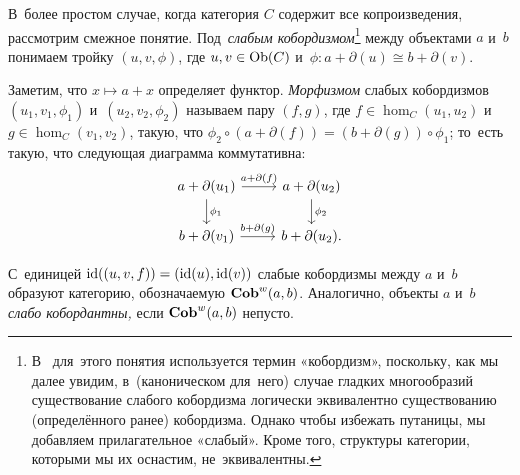 \documentclass[a4paper,oneside]{article}
\begin{document}
\medskip

В~более простом случае, когда категория $C$ содержит все копроизведения, рассмотрим смежное понятие.
Под~\textit{слабым кобордизмом}\footnote{
  В~\cite{Stong68} для~этого понятия используется термин «кобордизм», поскольку, как мы далее
  увидим, в~(каноническом для~него) случае гладких многообразий существование слабого кобордизма
  логически эквивалентно существованию (определённого ранее) кобордизма. Однако чтобы избежать путаницы,
  мы добавляем прилагательное «слабый». Кроме того, структуры категории, которыми мы их оснастим, не~эквивалентны.
} между объектами $a$ и~$b$
понимаем тройку $(u, v, \phi)$, где $u, v \in \mathrm{Ob}(C)$ и~$\phi : a + \partial(u) \cong b + \partial(v)$.

Заметим, что $x \mapsto a + x$ определяет функтор. \textit{Морфизмом} слабых кобордизмов $(u_1, v_1, \phi_1)$
и~$(u_2, v_2, \phi_2)$ называем пару $(f, g)$, где $f \in \hom_C(u_1, u_2)$ и~$g \in \hom_C(v_1, v_2)$,
такую, что $\phi_2 \circ (a + \partial(f)) = (b + \partial(g)) \circ \phi_1$; то~есть такую, что следующая
диаграмма коммутативна:
\[
  \begin{tikzcd}
    \arrow{d}{\phi_1} a + \partial(u_1) \arrow{r}{a + \partial(f)} & a + \partial(u_2) \arrow{d}{\phi_2} \\
                      b + \partial(v_1) \arrow{r}{b + \partial(g)} & b + \partial(u_2).
  \end{tikzcd}
\]

С~единицей $\mathrm{id}((u, v, f)) = (\mathrm{id}(u), \mathrm{id}(v))$ слабые кобордизмы между $a$ и~$b$ образуют категорию, обозначаемую $\mathbf{Cob}^w(a, b)$.
Аналогично, объекты $a$ и~$b$ \textit{слабо кобордантны,} если $\mathbf{Cob}^w(a, b)$ непусто.
\end{document}
